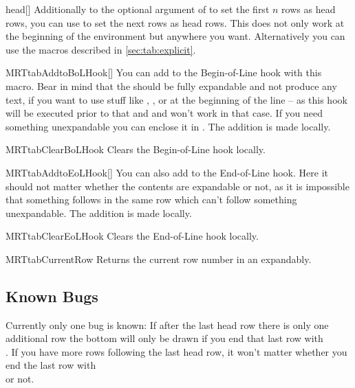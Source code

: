 \begin{describemacro}{head}[]%
  Additionally to the optional argument of  to set the first $n$
  rows as head rows, you can use  to set the next  rows as
  head rows. This does not only work at the beginning of the environment but
  anywhere you want. Alternatively you can use the macros described in
  \autoref{sec:tab:explicit}.
\end{describemacro}%

\begin{describemacro}{MRTtabAddtoBoLHook}[]%
  You can add  to the Begin-of-Line hook with this macro. Bear in
  mind that the  should be fully expandable and not produce any
  text, if you want to use stuff like , , or
   at the beginning of the line -- as this hook will be executed prior
  to that and  and  won't work in that case. If you need
  something unexpandable you can enclose it in . The addition is
  made locally.
\end{describemacro}%

\begin{describemacro}{MRTtabClearBoLHook}%
  Clears the Begin-of-Line hook locally.
\end{describemacro}%

\begin{describemacro}{MRTtabAddtoEoLHook}[]%
  You can also add  to the End-of-Line hook. Here it should not
  matter whether the contents are expandable or not, as it is impossible that
  something follows in the same row which can't follow something unexpandable.
  The addition is made locally.
\end{describemacro}%

\begin{describemacro}{MRTtabClearEoLHook}%
  Clears the End-of-Line hook locally.
\end{describemacro}%

\begin{describemacro}{MRTtabCurrentRow}%
  Returns the current row number in an  expandably.
\end{describemacro}%

\subsection{Known Bugs}
Currently only one bug is known: If after the last head row there is only one
additional row the bottom  will only be drawn if you end that last row
with \texttt{\string\\}. If you have more rows following the last head row,
it won't matter whether you end the last row with \texttt{\string\\} or not.


